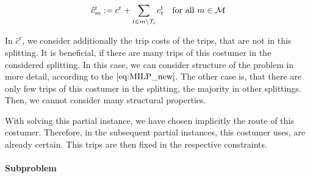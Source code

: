 \begin{align}
	\hat{c}^{\operatorname{r}}_m := c^{\operatorname{r}} + \sum_{t\in m\backslash\mathcal{T}_i}c^{\operatorname{t}}_t & & \text{for all } m\in\mathcal{M}
\end{align}

In $\hat{c}^{\operatorname{r}}$, we consider additionally the trip costs of the trips, that are not in this splitting. It is beneficial, if there are many trips of this costumer in the considered splitting. In this case, we can consider structure of the problem in more detail, according to the $\eqref{eq:MILP_new}$. The other case is, that there are only few trips of this costumer in the splitting, the majority in other splittings. Then, we cannot consider many structural properties. 

With solving this partial instance, we have chosen implicitly the route of this costumer. Therefore, in the subsequent partial instances, this costumer uses, are already certain. This trips are then fixed in the respective constraints.

\paragraph{Subproblem} \parfill